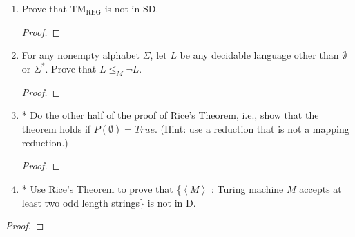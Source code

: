 \documentclass[10pt]{article}
\newcommand{\brackets}[1]{\left< #1 \right>}
\begin{document}
\begin{enumerate}[1)]
\item
Prove that $\mathrm{TM_{REG}}$ is not in SD.
\begin{proof}[Proof]
\end{proof}


\item
For any nonempty alphabet $\Sigma$, let $L$ be any decidable language other than $\emptyset$ or $\Sigma ^*$. Prove that $L \leq _M \lnot L$.
\begin{proof}[Proof]
\end{proof}



\item
* Do the other half of the proof of Rice's Theorem, i.e., show that the theorem holds if $P(\emptyset) = True$. (Hint: use a reduction that is not a mapping reduction.)
\begin{proof}[Proof]
\end{proof}


\item
* Use Rice's Theorem to prove that \{$\brackets{M}$ : Turing machine $M$ accepts at least two odd length strings\} is not in D.
\end{enumerate}
\begin{proof}[Proof]
\end{proof}
\end{document}

